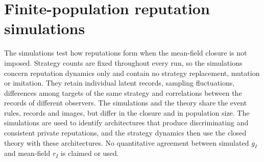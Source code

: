 \documentclass[fleqn,10pt]{wlscirep}
\theoremstyle{plain}
\begin{document}
\section{Finite-population reputation simulations}
\label{si:simulations}

The simulations test how reputations form when the mean-field closure is not imposed. Strategy counts are fixed throughout every run, so the simulations concern reputation dynamics only and contain no strategy replacement, mutation or imitation. They retain individual latent records, sampling fluctuations, differences among targets of the same strategy and correlations between the records of different observers. The simulations and the theory share the event rules, records and images, but differ in the closure and in population size. The simulations are used to identify architectures that produce discriminating and consistent private reputations, and the strategy dynamics then use the closed theory with these architectures. No quantitative agreement between simulated $g_I$ and mean-field $r_I$ is claimed or used.
\end{document}
